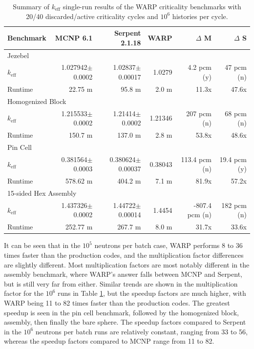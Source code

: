 \begin{table}[h]
\centering
\caption{Summary of $k_\mathrm{eff}$ single-run results of the WARP criticality benchmarks with 20/40 discarded/active criticality cycles and $10^6$ histories per cycle.}
\label{benchmark_summary_6}
\begin{tabular}{| l | r | r | r | r | r |}
 \hline
 Benchmark & MCNP 6.1 & Serpent 2.1.18 & WARP & $\Delta$ M & $\Delta$ S  \\
\hline
\hline
\multicolumn{6}{|l|}{Jezebel}  \\
\hline
 $k_\mathrm{eff}$ & 1.027942$\pm$0.0002 & 1.02837$\pm$0.00017 & 1.0279 & 4.2 pcm (y) & 47 pcm  (n) \\
 \hline
 Runtime               & 22.75 m & 95.8 m &  2.0 m & 11.3x  & 47.6x  \\
 \hline
 \hline
\multicolumn{6}{|l|}{Homogenized Block }\\
\hline
 $k_\mathrm{eff}$ & 1.215533$\pm$0.0002 & 1.21414$\pm$0.0002 & 1.21346 & 207 pcm (n) &  68 pcm (n)  \\
 \hline
 Runtime               & 150.7 m & 137.0 m & 2.8 m & 53.8x & 48.6x  \\
 \hline
  \hline
\multicolumn{6}{|l|}{Pin Cell}\\
\hline
 $k_\mathrm{eff}$ & 0.381564$\pm$0.0003 & 0.380624$\pm$0.00037 & 0.38043 & 113.4 pcm (n) &  19.4 pcm (y)  \\
 \hline
 Runtime               & 578.62 m & 404.2 m & 7.1 m & 81.9x & 57.2x \\
 \hline
  \hline
\multicolumn{6}{|l|}{15-sided Hex Assembly}\\
\hline
 $k_\mathrm{eff}$ & 1.437326$\pm$0.0002 & 1.44722$\pm$0.00014 & 1.4454 & -807.4 pcm (n) &  182 pcm (n) \\
 \hline
 Runtime               & 252.77 m & 267.7 m & 8.0 m & 31.7x & 33.6x \\
 \hline
\end{tabular}
\end{table}

It can be seen that in the $10^5$ neutrons per batch case, WARP performs 8 to 36 times faster than the production codes, and the multiplication factor differences are slightly different.  Most multiplication factors are most notably different in the assembly benchmark, where WARP's answer falls between MCNP and Serpent, but is still very far from either.  Similar trends are shown in the multiplication factor for the $10^6$ runs in Table \ref{benchmark_summary_6}, but the speedup factors are much higher, with WARP being 11 to 82 times faster than the production codes.   The greatest speedup is seen in the pin cell benchmark, followed by the homogenized block, assembly, then finally the bare sphere.  The speedup factors compared to Serpent in the $10^6$ neutrons per batch runs are relatively constant, ranging from 33 to 56, whereas the speedup factors compared to MCNP range from 11 to 82.


